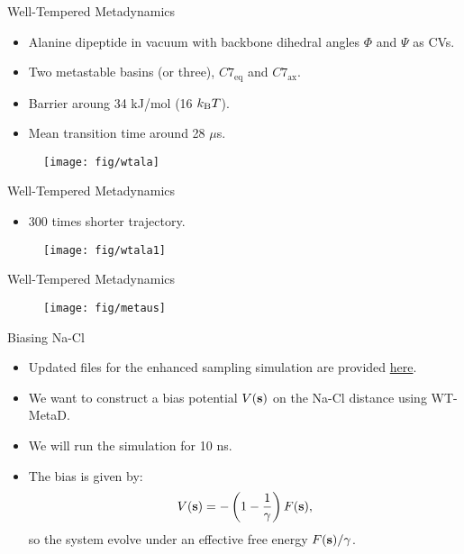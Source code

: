 \documentclass[10pt]{beamer}
\begin{document}
\begin{frame}{Well-Tempered Metadynamics}
\begin{itemize}
\setlength\itemsep{1em}
  \item Alanine dipeptide in vacuum with backbone dihedral angles $\Phi$ and $\Psi$ as CVs.

  \item Two metastable basins (or three), $C7_{\mathrm{eq}}$ and $C7_{\mathrm{ax}}$.

  \item Barrier aroung 34 kJ/mol (16 $k_\mathrm{B}T$).

  \item Mean transition time around 28 $\mu$s.
\end{itemize}
\begin{figure}
  \texttt{[image: fig/wtala]}
\end{figure}
\end{frame}

\begin{frame}{Well-Tempered Metadynamics}
\begin{itemize}
\setlength\itemsep{1em}
  \item 300 times shorter trajectory.
\end{itemize}
\begin{figure}
  \texttt{[image: fig/wtala1]}
\end{figure}
\end{frame}

\begin{frame}{Well-Tempered Metadynamics}
\begin{figure}
  \texttt{[image: fig/metaus]}
\end{figure}
\end{frame}

\begin{frame}{Biasing Na-Cl}
\begin{itemize}
\setlength\itemsep{1em}
  \item Updated files for the enhanced sampling simulation are provided \href{https://github.com/jakryd/0800-fizobl/tree/main/project-2}{here}.
  \item We want to construct a bias potential $V({\bf s})$ on the Na-Cl distance using WT-MetaD.
  \item We will run the simulation for 10 ns.
  \item The bias is given by:
  \begin{equation}
    V({\bf s})=-\left(1-\frac{1}{\gamma}\right)F({\bf s}),
  \end{equation}
  so the system evolve under an effective free energy $F({\bf s})/\gamma$.
\end{itemize}
\end{frame}
\end{document}
